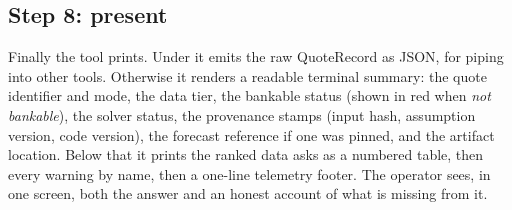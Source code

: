 \subsection{Step 8: present}

Finally the tool prints. Under  it emits the raw QuoteRecord as JSON, for piping into other tools. Otherwise it renders a readable terminal summary: the quote identifier and mode, the data tier, the bankable status (shown in red when \emph{not bankable}), the solver status, the provenance stamps (input hash, assumption version, code version), the forecast reference if one was pinned, and the artifact location. Below that it prints the ranked data asks as a numbered table, then every warning by name, then a one-line telemetry footer. The operator sees, in one screen, both the answer and an honest account of what is missing from it.


